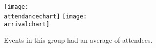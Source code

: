 \documentclass[12pt]{article}
\title{\groupname}
\begin{document}
\center\large{\textbf{\groupname}}

\texttt{[image: \\attendancechart]}
\texttt{[image: \\arrivalchart]}

Events in this group had an average of \averageall attendees.
\end{document}
